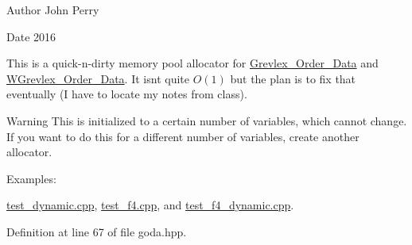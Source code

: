 \begin{DoxyAuthor}{Author}
John Perry 
\end{DoxyAuthor}
\begin{DoxyDate}{Date}
2016
\end{DoxyDate}
This is a quick-\/n-\/dirty memory pool allocator for \hyperlink{group__orderinggroup_class_grevlex___order___data}{Grevlex\+\_\+\+Order\+\_\+\+Data} and \hyperlink{group__orderinggroup_class_w_grevlex___order___data}{W\+Grevlex\+\_\+\+Order\+\_\+\+Data}. It isn\textquotesingle{}t quite $O(1)$ but the plan is to fix that eventually (I have to locate my notes from class). \begin{DoxyWarning}{Warning}
This is initialized to a certain number of variables, which cannot change. If you want to do this for a different number of variables, create another allocator. 
\end{DoxyWarning}
\begin{Desc}
\item[Examples\+: ]\par
\hyperlink{test_dynamic_8cpp-example}{test\+\_\+dynamic.\+cpp}, \hyperlink{test_f4_8cpp-example}{test\+\_\+f4.\+cpp}, and \hyperlink{test_f4_dynamic_8cpp-example}{test\+\_\+f4\+\_\+dynamic.\+cpp}.\end{Desc}


Definition at line 67 of file goda.\+hpp.

